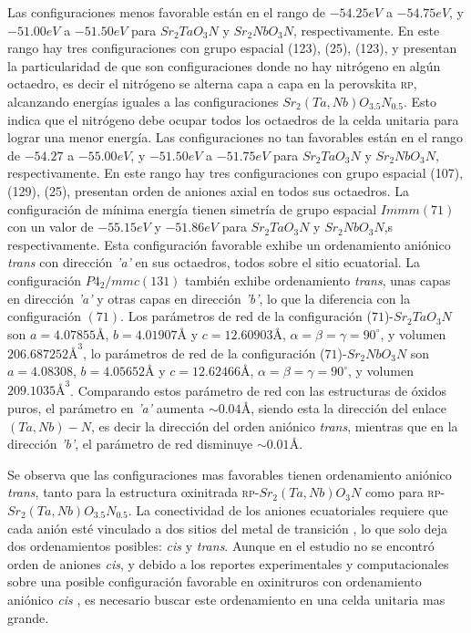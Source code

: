 Las configuraciones menos favorable están en el rango de $-54.25 eV$ a $-54.75 eV$, y $-51.00 eV$ a $-51.50 eV$ para $Sr_{2}TaO_{3}N$ y  $Sr_{2}NbO_{3}N$, respectivamente. En este rango hay tres configuraciones con grupo espacial (123), (25), (123), y presentan la particularidad de que son configuraciones donde no hay nitrógeno en algún octaedro, es decir el nitrógeno se alterna capa a capa en la perovskita \textsc{rp}, alcanzando energías iguales a las configuraciones $Sr_{2}(Ta,Nb)O_{3.5}N_{0.5}$. Esto indica que el nitrógeno debe ocupar todos los octaedros de la celda unitaria para lograr una menor energía. Las configuraciones no tan favorables están en el rango de $-54.27$ a $-55.00 eV$, y $-51.50 eV$ a $-51.75 eV$ para $Sr_{2}TaO_{3}N$ y  $Sr_{2}NbO_{3}N$, respectivamente. En este rango hay tres configuraciones con grupo espacial (107), (129), (25), presentan orden de aniones axial en todos sus octaedros. La configuración de mínima energía tienen simetría de grupo espacial $Immm(71)$ con un valor de $-55.15  eV$ y $-51.86  eV$ para $Sr_{2}TaO_{3}N$ y  $Sr_{2}NbO_{3}N$,s respectivamente. Esta configuración favorable exhibe un ordenamiento aniónico \emph{trans} con dirección \emph{'a'} en sus octaedros, todos sobre el sitio ecuatorial. La configuración $P4_{2}/mmc(131)$ también exhibe ordenamiento \emph{trans}, unas capas en dirección \emph{'a'} y otras capas en dirección \emph{'b'}, lo que la diferencia con la configuración $(71)$. Los parámetros de red de la configuración ($71$)-$Sr_{2}TaO_{3}N$ son $a=4.07855 \si{\angstrom}$, $b=4.01907 \si{\angstrom}$ y $c=12.60903 \si{\angstrom}$, $\alpha=\beta=\gamma=90^{\circ}$, y volumen $206.687252\si{\angstrom}^{3}$,  lo parámetros de red de la configuración ($71$)-$Sr_{2}NbO_{3}N$ son $a=4.08308$, $b=4.05652 \si{\angstrom}$ y $c=12.62466 \si{\angstrom}$, $\alpha=\beta=\gamma=90^{\circ}$, y volumen $209.1035  \si{\angstrom}^{3}$. Comparando estos parámetro de red con las estructuras de óxidos puros, el parámetro en \emph{'a'} aumenta $\sim0.04  \si{\angstrom}$, siendo esta la dirección del enlace $(Ta,Nb)-N$, es decir la dirección del orden aniónico \emph{trans}, mientras que en la dirección \emph{'b'}, el parámetro de red disminuye $\sim0.01 \si{\angstrom}$.

Se observa que las configuraciones mas favorables tienen ordenamiento aniónico \emph{trans}, tanto para la estructura oxinitrada \textsc{rp-}$Sr_{2}(Ta,Nb)O_{3}N$ como para  \textsc{rp-}$Sr_{2}(Ta,Nb)O_{3.5}N_{0.5}$. La conectividad de los aniones ecuatoriales requiere que cada anión esté vinculado a dos sitios del metal de transición \cite{Harada2019}, lo que solo deja dos ordenamientos posibles: \emph{cis} y \emph{trans}. Aunque en el estudio no se encontró orden de aniones \emph{cis}, y debido a los reportes experimentales y computacionales sobre una posible configuración favorable en oxinitruros con ordenamiento aniónico \emph{cis} \cite{Masubuchi2013SynthesisCeramics,Yang2011,Harada2019, Bouri2018}, es necesario buscar este ordenamiento en una celda unitaria mas grande.

